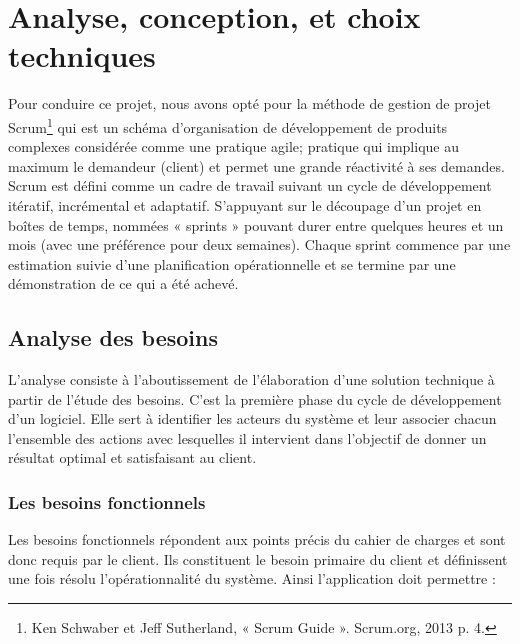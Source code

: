 \chapter{Analyse, conception, et choix techniques}

Pour conduire ce projet, nous avons opté pour la méthode de gestion de projet Scrum\footnote{Ken Schwaber et Jeff Sutherland, « Scrum Guide ». Scrum.org, 2013 p. 4.} qui est un schéma d’organisation de développement de produits complexes considérée comme une pratique agile; pratique qui implique au maximum le demandeur (client) et permet une grande réactivité à ses demandes. Scrum est défini comme un cadre de travail suivant un cycle de développement itératif, incrémental et adaptatif. S’appuyant sur le découpage d'un projet en boîtes de temps, nommées « sprints » pouvant durer entre quelques heures et un mois (avec une préférence pour deux semaines). Chaque sprint commence par une estimation suivie d'une planification opérationnelle et se termine par une démonstration de ce qui a été achevé.

\section{Analyse des besoins} 

L’analyse consiste à l’aboutissement de l’élaboration d’une solution technique à partir de l’étude des besoins. C’est la première phase du cycle de développement d’un logiciel. Elle sert à identifier les acteurs du système et leur associer chacun l’ensemble des actions avec lesquelles il intervient dans l’objectif de donner un résultat optimal et satisfaisant au client.

\subsection{Les besoins fonctionnels}

Les besoins fonctionnels répondent aux points précis du cahier de charges et sont donc requis par le client. Ils constituent le besoin primaire du client et définissent une fois résolu l’opérationnalité du système. Ainsi l’application doit permettre :

